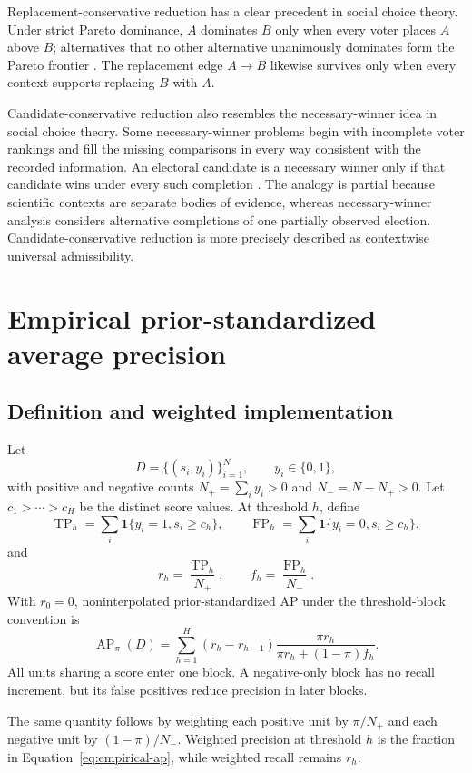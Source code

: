 \documentclass[11pt]{article}
\newcommand{\AP}{\operatorname{AP}}
\theoremstyle{remark}
\begin{document}
Replacement-conservative reduction has a clear precedent in social choice
theory. Under strict Pareto dominance, $A$ dominates $B$ only when every voter
places $A$ above $B$; alternatives that no other alternative unanimously
dominates form the Pareto frontier \cite{sen1970collective}. The replacement
edge $A\to B$ likewise survives only when every context supports replacing
$B$ with $A$. 

Candidate-conservative reduction also resembles the necessary-winner idea in
social choice theory. Some necessary-winner problems begin with incomplete
voter rankings and fill the missing comparisons in every way consistent with
the recorded information. An electoral candidate is a necessary winner only
if that candidate wins under every such completion \cite{xia2011possible}.
The analogy is partial because scientific contexts are separate bodies of
evidence, whereas necessary-winner analysis considers alternative completions
of one partially observed election. Candidate-conservative reduction is more
precisely described as contextwise universal admissibility.


\section{Empirical prior-standardized average precision}
\label{app:ap}

\subsection{Definition and weighted implementation}

Let
\[
D=\{(s_i,y_i)\}_{i=1}^N,
\qquad y_i\in\{0,1\},
\]
with positive and negative counts $N_+=\sum_i y_i>0$ and
$N_-=N-N_+>0$. Let $c_1>\cdots>c_H$ be the distinct score values. At
threshold $h$, define
\[
\operatorname{TP}_h
=\sum_i\mathbf 1\{y_i=1,s_i\geq c_h\},
\qquad
\operatorname{FP}_h
=\sum_i\mathbf 1\{y_i=0,s_i\geq c_h\},
\]
and
\[
r_h=\frac{\operatorname{TP}_h}{N_+},
\qquad
f_h=\frac{\operatorname{FP}_h}{N_-}.
\]
With $r_0=0$, noninterpolated prior-standardized AP under the threshold-block
convention is
\begin{equation}
\AP_\pi(D)
=
\sum_{h=1}^H
(r_h-r_{h-1})
\frac{\pi r_h}{\pi r_h+(1-\pi)f_h}.
\label{eq:empirical-ap}
\end{equation}
All units sharing a score enter one block. A negative-only block has no recall
increment, but its false positives reduce precision in later blocks.

The same quantity follows by weighting each positive unit by $\pi/N_+$ and
each negative unit by $(1-\pi)/N_-$. Weighted precision at threshold $h$ is
the fraction in Equation~\eqref{eq:empirical-ap}, while weighted recall remains
$r_h$.
\end{document}
